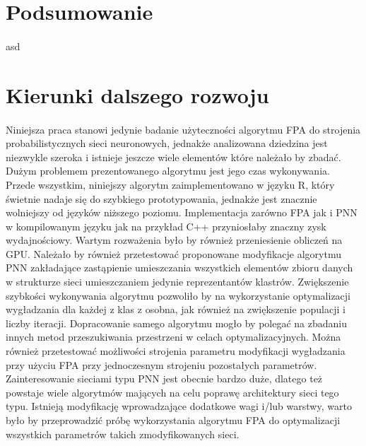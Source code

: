 \documentclass[a4paper,12pt,twoside]{article}
\begin{document}
\newpage
\section{Podsumowanie}
\paragraph{}
asd
\newline
\newpage
\thispagestyle{empty}
\mbox{}

\newpage
\section{Kierunki dalszego rozwoju}
\paragraph{}
Niniejsza praca stanowi jedynie badanie użyteczności algorytmu FPA do strojenia probabilistycznych sieci neuronowych, jednakże analizowana dziedzina jest niezwykle szeroka i istnieje jeszcze wiele elementów które należało by zbadać. Dużym problemem prezentowanego algorytmu jest jego czas wykonywania.  Przede wszystkim, niniejszy algorytm zaimplementowano w języku R, który świetnie nadaje się do szybkiego prototypowania, jednakże jest znacznie wolniejszy od języków niższego poziomu. Implementacja zarówno FPA jak i PNN w kompilowanym języku jak na przykład C++ przyniosłaby znaczny zysk wydajnościowy. Wartym rozważenia było by również przeniesienie obliczeń na GPU. Należało by również przetestować proponowane modyfikacje algorytmu PNN zakładające zastąpienie umieszczania wszystkich elementów zbioru danych w strukturze sieci umieszczaniem jedynie reprezentantów klastrów. Zwiększenie szybkości wykonywania algorytmu pozwoliło by na wykorzystanie optymalizacji wygładzania dla każdej z klas z osobna, jak również na zwiększenie populacji i liczby iteracji. Dopracowanie samego algorytmu mogło by polegać na zbadaniu innych metod przeszukiwania przestrzeni w celach optymalizacyjnych. Można również przetestować możliwości strojenia parametru modyfikacji wygładzania przy użyciu FPA przy jednoczesnym strojeniu pozostałych parametrów. Zainteresowanie sieciami typu PNN jest obecnie bardzo duże, dlatego też powstaje wiele algorytmów mających na celu poprawę architektury sieci tego typu. Istnieją modyfikację wprowadzające dodatkowe wagi i/lub warstwy, warto było by przeprowadzić próbę wykorzystania algorytmu FPA do optymalizacji wszystkich parametrów takich zmodyfikowanych sieci.
\end{document}
